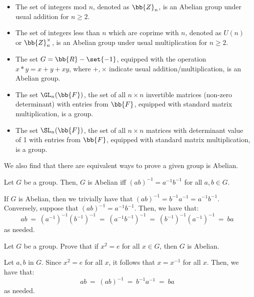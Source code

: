 \documentclass{article}
\begin{document}
\begin{lm}[]
\begin{itemize}[]
    \item The set of integers mod $ n $, denoted as $ \bb{Z}_{n} $, is an Abelian group under usual addition for $ n \geq 2 $.
    \item The set of integers less than $ n $ which are coprime with $ n $, denoted as $ U(n) $ or $ \bb{Z}_{n}^{\times} $, is an Abelian group under usual multiplication for $ n \geq 2 $.
    \item The set $ G = \bb{R} - \set{-1} $, equipped with the operation $ x * y = x + y + xy $, where $ +, \times $ indicate usual addition/multiplication, is an Abelian group.
    \item The set $ \GL_{n}(\bb{F}) $, the set of all $ n \times n $ invertible matrices (non-zero determinant) with entries from $ \bb{F} $, equipped with standard matrix multiplication, is a group.
    \item The set $ \SL_{n}(\bb{F}) $, the set of all $ n \times n $ matrices with determinant value of 1 with entries from $ \bb{F} $, equipped with standard matrix multiplication, is a group.
\end{itemize}
\end{lm}

We also find that there are equivalent ways to prove a given group is Abelian.

\begin{thm}[]
Let $ G $ be a group. Then, $ G $ is Abelian iff $ (ab)^{-1} = a^{-1}b^{-1} $ for all $ a, b \in G $.
\end{thm}

\begin{pf}[source=Primary Source Material]
If $ G $ is Abelian, then we trivially have that $ (ab)^{-1} = b^{-1}a^{-1} = a^{-1}b^{-1} $. Conversely, suppose that $ (ab)^{-1} = a^{-1}b^{-1} $. Then, we have that:
\begin{equation*}
    ab \ = \ (a^{-1})^{-1}(b^{-1})^{-1} \ = \ (a^{-1}b^{-1})^{-1} \ = \ (b^{-1})^{-1}(a^{-1})^{-1} \ = \ ba
\end{equation*}
as needed.
\end{pf}

\begin{thm}
Let $ G $ be a group. Prove that if $ x^{2} = e $ for all $ x \in G $, then $ G $ is Abelian.
\end{thm}

\begin{pf}[source=Primary Source Material]
Let $ a, b $ in $ G $. Since $ x^{2} = e $ for all $ x $, it follows that $ x = x^{-1} $ for all $ x $. Then, we have that:
\begin{equation*}
ab \ = \ (ab)^{-1} \ = \ b^{-1}a^{-1} \ = \ ba
\end{equation*}
as needed.
\end{pf}
\end{document}

